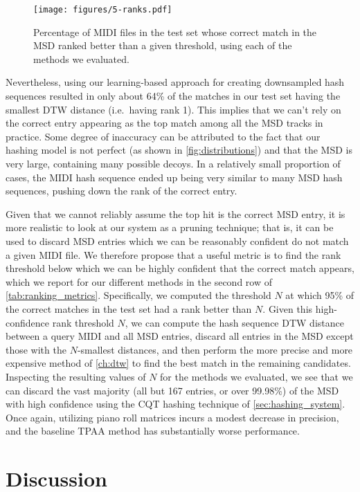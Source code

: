 \begin{figure}
  \texttt{[image: figures/5-ranks.pdf]}
  \caption[Percentage of the test set below a given rank]{Percentage of MIDI files in the test set whose correct match in the MSD ranked better than a given threshold, using each of the methods we evaluated.}
  \label{fig:ranks}
\end{figure}

Nevertheless, using our learning-based approach for creating downsampled hash sequences resulted in only about 64\% of the matches in our test set having the smallest DTW distance (i.e.\ having rank 1).
This implies that we can't rely on the correct entry appearing as the top match among all the MSD tracks in practice.
Some degree of inaccuracy can be attributed to the fact that our hashing model is not perfect (as shown in \cref{fig:distributions}) and that the MSD is very large, containing many possible decoys.
In a relatively small proportion of cases, the MIDI hash sequence ended up being very similar to many MSD hash sequences, pushing down the rank of the correct entry.

Given that we cannot reliably assume the top hit is the correct MSD entry, it is more realistic to look at our system as a pruning technique; that is, it can be used to discard MSD entries which we can be reasonably confident do not match a given MIDI file.
We therefore propose that a useful metric is to find the rank threshold below which we can be highly confident that the correct match appears, which we report for our different methods in the second row of \cref{tab:ranking_metrics}.
Specifically, we computed the threshold $N$ at which 95\% of the correct matches in the test set had a rank better than $N$.
Given this high-confidence rank threshold $N$, we can compute the hash sequence DTW distance between a query MIDI and all MSD entries, discard all entries in the MSD except those with the $N$-smallest distances, and then perform the more precise and more expensive method of \cref{ch:dtw} to find the best match in the remaining candidates.
Inspecting the resulting values of $N$ for the methods we evaluated, we see that we can discard the vast majority (all but 167 entries, or over 99.98\%) of the MSD with high confidence using the CQT hashing technique of \cref{sec:hashing_system}.
Once again, utilizing piano roll matrices incurs a modest decrease in precision, and the baseline TPAA method has substantially worse performance.

\section{Discussion}
\label{sec:dhs_discussion}

